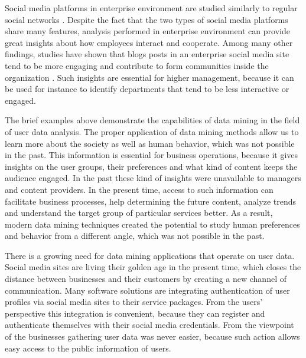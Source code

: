     Social media platforms in enterprise environment are studied similarly to regular social networks \cite{guy2016whatsyourorganizationlike}. Despite the fact that the two types of social media platforms share many features, analysis performed in enterprise environment can provide great insights about how employees interact and cooperate. Among many other findings, studies have shown that blogs posts in an enterprise social media site tend to be more engaging and contribute to form communities inside the organization \cite{guy2016whatsyourorganizationlike}. Such insights are essential for higher management, because it can be used for instance to identify departments that tend to be less interactive or engaged.  


    The brief examples above demonstrate the capabilities of data mining in the field of user data analysis. The proper application of data mining methods allow us to learn more about the society as well as human behavior, which was not possible in the past. This information is essential for business operations, because it gives insights on the user groups, their preferences and what kind of content keeps the audience engaged. In the past these kind of insights were unavailable to managers and content providers. In the present time, access to such information can facilitate business processes, help determining the future content, analyze trends and understand the target group of particular services better. As a result, modern data mining techniques created the potential to study human preferences and behavior from a different angle, which was not possible in the past. 

    There is a growing need for data mining applications that operate on user data. Social media sites are living their golden age in the present time, which closes the distance between businesses and their customers by creating a new channel of communication. Many software solutions are integrating authentication of user profiles via social media sites to their service packages. From the users' perspective this integration is convenient, because they can register and authenticate themselves with their social media credentials. From the viewpoint of the businesses gathering user data was never easier, because such action allows easy access to the public information of users. 

